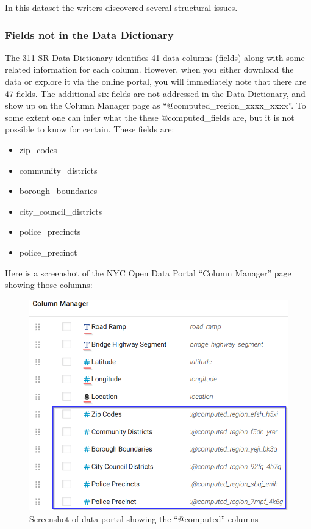 \documentclass[12pt, titlepage]{article}
\begin{document}
In this dataset the writers discovered several structural issues.

	\subsubsection{Fields not in the Data Dictionary}
	The 311 SR \href{https://data.cityofnewyork.us/api/views/erm2-nwe9/files/b372b884-f86a-453b-ba16-1fe06ce9d212?download=true&filename=311_ServiceRequest_2010-Present_DataDictionary_Updated_2023.xlsx}{Data Dictionary}
	 identifies 41 data columns (fields) along with some
	related information for each column. However, when you either download the data or explore it via the online portal,
	you will immediately note that there are 47 fields. The additional six fields are not addressed in the Data Dictionary, and show up on the Column Manager
	page as ``@computed\_region\_xxxx\_xxxx''. To some extent one can infer what the these @computed\_fields are, but it is not possible to know
	for certain. These fields are:
	\begin{itemize}
		\item zip\_codes
		\item community\_districts
		\item borough\_boundaries
		\item city\_council\_districts
		\item police\_precincts
		\item police\_precinct 
	\end{itemize}	

	Here is a screenshot of the NYC Open Data Portal ``Column Manager'' page showing those columns:

	\begin{figure}[htbp]
	  \centering
		  \includegraphics[scale=0.65]{computed_columns_screenshot.png}
		  \caption{Screenshot of data portal showing the ``@computed'' columns}
		  \label{fig:computed-columns}
	\end{figure}
\end{document}
